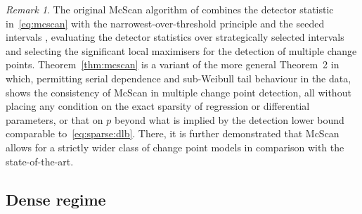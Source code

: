 \documentclass[11pt, a4paper]{article}
\theoremstyle{definition}
\theoremstyle{definition}
\theoremstyle{definition}
\theoremstyle{definition}
\theoremstyle{definition}
\theoremstyle{remark}
\newtheorem{rem}{Remark}[section]
\theoremstyle{definition}
\theoremstyle{definition}
\theoremstyle{definition}
\begin{document}
\begin{rem} %
\label{rem:mcscan}
The original McScan algorithm of \cite{cho2024detection} combines the detector statistic in~\eqref{eq:mcscan} with the narrowest-over-threshold principle \citep{baranowski2019narrowest} and the seeded intervals \citep{kovacs2020seeded}, evaluating the detector statistics over strategically selected intervals and selecting the significant local maximisers for the detection of multiple change points. 
Theorem~\ref{thm:mcscan} is a variant of the more general Theorem~2 in \cite{cho2024detection} which, permitting serial dependence and sub-Weibull tail behaviour in the data, shows the consistency of McScan in multiple change point detection, all without placing any condition on the exact sparsity of regression or differential parameters, or that on $p$ beyond what is implied by the detection lower bound comparable to~\eqref{eq:sparse:dlb}.
There, it is further demonstrated that McScan allows for a strictly wider class of change point models in comparison with the state-of-the-art. %
\end{rem}

\subsection{Dense regime}
\label{sec:dense}
\end{document}
